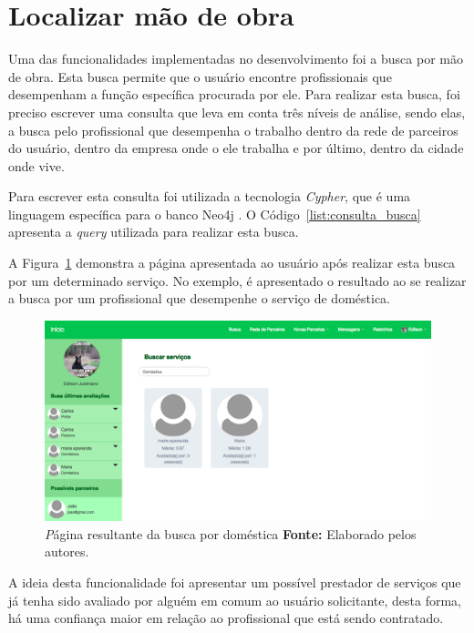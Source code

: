 \section{Localizar mão de obra}

\par Uma das funcionalidades implementadas no desenvolvimento foi a busca por mão de obra. Esta busca permite que o usuário encontre profissionais que desempenham a função específica procurada por ele. Para realizar esta busca, foi preciso escrever uma consulta que leva em conta três níveis de análise, sendo elas, a busca pelo profissional que desempenha o trabalho dentro da rede de parceiros do usuário, dentro da empresa onde o ele trabalha e por último, dentro da cidade onde vive.  

\par Para escrever esta consulta foi utilizada a tecnologia \textit{Cypher}, que é uma linguagem específica para o banco Neo4j \cite{neo4j_team_manual}. O Código~\ref{list:consulta_busca} apresenta a \textit{query} utilizada para realizar esta busca.


\par A Figura~\ref{fig:busca_domestica_edilson} demonstra a página apresentada ao usuário após realizar esta busca por um determinado serviço. No exemplo, é apresentado o resultado ao se realizar a busca por um profissional que desempenhe o serviço de doméstica.

\newpage
\begin{figure}[h!]
	\centerline{\includegraphics[scale=0.3]{./imagens/busca-domestica-edilson.png}}
	\caption[\textit Página resultante da busca por doméstica.]
	{\textit Página resultante da busca por doméstica \textbf{Fonte:} Elaborado pelos autores.}
	\label{fig:busca_domestica_edilson}
\end{figure}

\par A ideia desta funcionalidade foi apresentar um possível prestador de serviços que já tenha sido avaliado por alguém em comum ao usuário solicitante, desta forma, há uma confiança maior em relação ao profissional que está sendo contratado.
